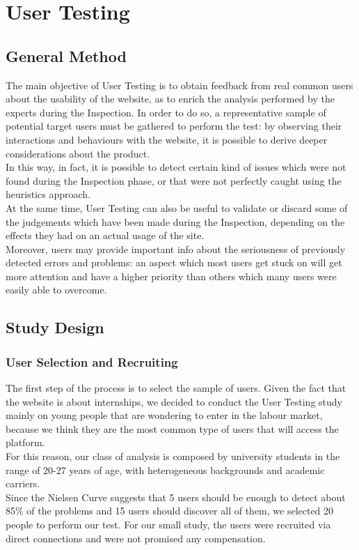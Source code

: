 \documentclass[11pt, letterpaper]{article}
\begin{document}
\newpage

\section{User Testing}
\subsection{General Method}
The main objective of User Testing is to obtain feedback from real common users about the usability of the website, as to enrich the analysis performed by the experts during the Inspection. In order to do so, a representative sample of potential target users must be gathered to perform the test: by observing their interactions and behaviours with the website, it is possible to derive deeper considerations about the product. \\
In this way, in fact, it is possible to detect certain kind of issues which were not found during the Inspection phase, or that were not perfectly caught using the heuristics approach.  \\
At the same time, User Testing can also be useful to validate or discard some of the judgements which have been made during the Inspection, depending on the effects they had on an actual usage of the site.  \\
Moreover, users may provide important info about the seriousness of previously detected errors and problems: an aspect which most users get stuck on will get more attention and have a higher priority than others which many users were easily able to overcome. 

\subsection{Study Design}
\subsubsection{User Selection and Recruiting}
The first step of the process is to select the sample of users. Given the fact that the website is about internships, we decided to conduct the User Testing study mainly on young people that are wondering to enter in the labour market, because we think they are the most common type of users that will access the platform. \\
For this reason, our class of analysis is composed by university students in the range of 20-27 years of age, with heterogeneous backgrounds and academic carriers. \\
Since the Nielsen Curve suggests that 5 users should be enough to detect about 85\% of the problems and 15 users should discover all of them, we selected 20 people to perform our test. For our small study, the users were recruited via direct connections and were not promised any compensation. 
\end{document}
